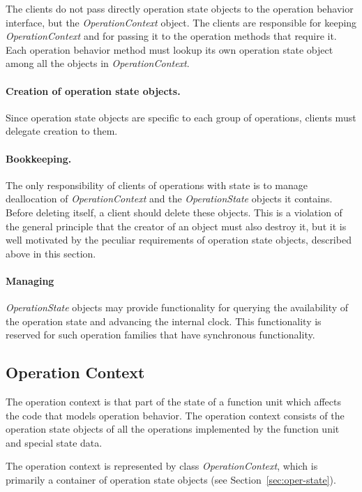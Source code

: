 \documentclass[twoside]{tce}
\begin{document}
The clients do not pass directly operation state objects to the operation
behavior interface, but the \emph{OperationContext} object.  The clients
are responsible for keeping \emph{OperationContext} and for passing it to
the operation methods that require it.
%
Each operation behavior method must lookup its own operation state object
among all the objects in \emph{OperationContext}.

\paragraph{Creation of operation state objects.}
Since operation state objects are specific to each group of operations,
clients must delegate creation to them.

\paragraph{Bookkeeping.}
The only responsibility of clients of operations with state is to manage
deallocation of \emph{OperationContext} and the \emph{OperationState}
objects it contains.  Before deleting itself, a client should delete these
objects.  This is a violation of the general principle that the creator of
an object must also destroy it, but it is well motivated by the peculiar
requirements of operation state objects, described above in this section.

\paragraph{Managing}
\emph{OperationState} objects may provide functionality for querying the
availability of the operation state and advancing the internal clock. 
This functionality is reserved for such operation families that have
synchronous functionality.

\subsection{Operation Context}

The operation context is that part of the state of a function unit which
affects the code that models operation behavior.  The operation context
consists of the operation state objects of all the operations implemented by
the function unit and special state data.

The operation context is represented by class \emph{OperationContext}, which
is primarily a container of operation state objects (see
Section~\ref{sec:oper-state}).
\end{document}
